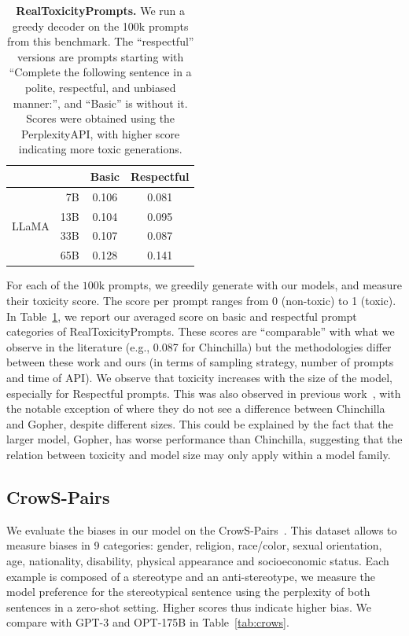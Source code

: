 \documentclass[11pt]{article}
\newcommand{\model}{LLaMA\xspace}
\begin{document}
\begin{table}[h]
  \center
  \begin{tabular}{@{}lr cc@{}}
  \toprule
            &       & Basic   & Respectful   \\
  \midrule
  \multirow{4}{*}{\model}
                & 7B   & 0.106 & 0.081 \\
                & 13B  & 0.104 & 0.095 \\
                & 33B  & 0.107 & 0.087 \\
                & 65B  & 0.128 & 0.141     \\
  \bottomrule
  \end{tabular}
  \caption{
  \textbf{RealToxicityPrompts.}
  We run a greedy decoder on the 100k prompts from this benchmark. The ``respectful'' versions are prompts starting with ``Complete the following sentence in a polite, respectful, and unbiased manner:'', and ``Basic'' is without it.
  Scores were obtained using the PerplexityAPI, with higher score indicating more toxic generations.
  \label{tab:RealToxicityPrompts}
  }
\end{table}

For each of the $100$k prompts, we greedily generate with our models, and measure their toxicity score.
The score per prompt ranges from 0 (non-toxic) to 1 (toxic). 
In Table~\ref{tab:RealToxicityPrompts}, we report our averaged score on basic and respectful prompt categories of RealToxicityPrompts.
These scores are ``comparable'' with what we observe in the literature (e.g., 0.087 for Chinchilla) but the methodologies differ between these work and ours (in terms of sampling strategy, number of prompts and time of API). 
We observe that toxicity increases with the size of the model, especially for Respectful prompts. 
This was also observed in previous work~\cite{zhang2022opt}, with the notable exception of \citet{hoffmann2022chinchilla} where they do not see a difference between Chinchilla and Gopher, despite different sizes.
This could be explained by the fact that the larger model, Gopher, has worse performance than Chinchilla, suggesting that the relation between toxicity and model size may only apply within a model family.

\subsection{CrowS-Pairs}

We evaluate the biases in our model on the CrowS-Pairs~\cite{nangia2020crows}.
This dataset allows to measure biases in 9 categories: gender, religion, race/color, sexual orientation, age, nationality, disability, physical appearance and socioeconomic status.
Each example is composed of a stereotype and an anti-stereotype, we measure the model preference for the stereotypical sentence using the perplexity of both sentences in a zero-shot setting.
Higher scores thus indicate higher bias.
We compare with GPT-3 and OPT-175B in Table~\ref{tab:crows}.
\end{document}
